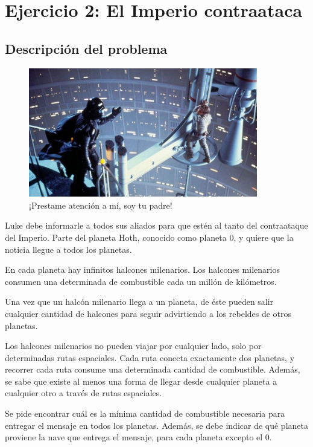 \section{Ejercicio 2: El Imperio contraataca}

    \subsection{Descripción del problema}

    \begin{figure}[ht]
        \begin{center}
            \includegraphics[width=10cm]{imagenes/el_imperio_contraataca.jpg}
            \caption{¡Prestame atención a mí, soy tu padre!}
        \end{center}
    \end{figure}

    Luke debe informarle a todos sus aliados para que estén al tanto del contraataque del Imperio. Parte del planeta Hoth, conocido como planeta 0, y quiere que la noticia llegue a todos los planetas.

    En cada planeta hay infinitos halcones milenarios. Los halcones milenarios consumen una determinada de combustible cada un millón de kilómetros.

    Una vez que un halcón milenario llega a un planeta, de éste pueden salir cualquier cantidad de halcones para seguir advirtiendo a los rebeldes de otros planetas.

    Los halcones milenarios no pueden viajar por cualquier lado, solo por determinadas rutas espaciales. Cada ruta conecta exactamente dos planetas, y recorrer cada ruta consume una determinada cantidad de combustible. Además, se sabe que existe al menos una forma de llegar desde cualquier planeta a cualquier otro a través de rutas espaciales.

    Se pide encontrar cuál es la mínima cantidad de combustible necesaria para entregar el mensaje en todos los planetas. Además, se debe indicar de qué planeta proviene la nave que entrega el mensaje, para cada planeta excepto el 0.

